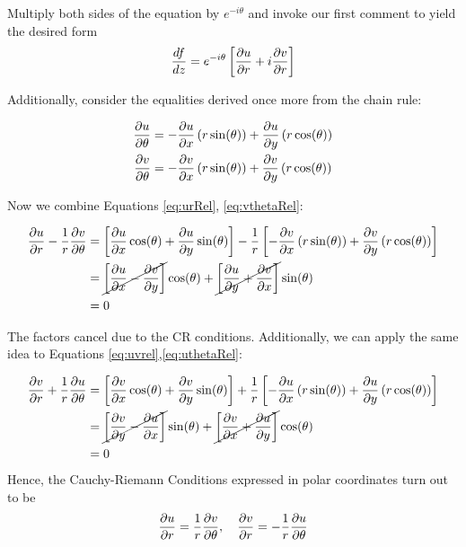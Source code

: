 \documentclass[12pt]{article}%
\begin{document}
Multiply both sides of the equation by $e^{-i\theta}$ and invoke our first comment to yield the desired form \[\frac{d{f}}{d{z}}= e^{-i\theta} \left[\frac{\partial{u}}{\partial{r}} + i\frac{\partial{v}}{\partial{r}} \right]\]

Additionally, consider the equalities derived once more from the chain rule:

\begin{align}
  \frac{\partial{u}}{\partial{\theta}} & = - \frac{\partial{u}}{\partial{x}}\left(r \sin(\theta)\right) + \frac{\partial{u}}{\partial{y}}\left(r\cos(\theta)\right) \label{eq:uthetaRel} \\
    \frac{\partial{v}}{\partial{\theta}} & = - \frac{\partial{v}}{\partial{x}}\left(r \sin(\theta)\right) + \frac{\partial{v}}{\partial{y}}\left(r\cos(\theta)\right) \label{eq:vthetaRel}
\end{align}

Now we combine Equations \ref{eq:urRel}, \ref{eq:vthetaRel}:

\begin{align*}
  \frac{\partial{u}}{\partial{r}} - \frac{1}{r}\frac{\partial{v}}{\partial{\theta}} & = \left[\frac{\partial{u}}{\partial{x}} \cos(\theta) + \frac{\partial{u}}{\partial{y}}\sin(\theta)\right] - \frac{1}{r}\left[- \frac{\partial{v}}{\partial{x}}\left(r \sin(\theta)\right) + \frac{\partial{v}}{\partial{y}}\left(r\cos(\theta)\right) \right] \\
  & = \cancel{\left[\frac{\partial{u}}{\partial{x}} - \frac{\partial{v}}{\partial{y}}\right]} \cos(\theta) + \cancel{\left[\frac{\partial{u}}{\partial{y}} +  \frac{\partial{v}}{\partial{x}}\right]} \sin(\theta) \\
  & = 0
\end{align*}

The factors cancel due to the CR conditions. Additionally, we can apply the same idea to Equations \ref{eq:uvrel},\ref{eq:uthetaRel}:

\begin{align*}
  \frac{\partial{v}}{\partial{r}} + \frac{1}{r}\frac{\partial{u}}{\partial{\theta}} & = \left[\frac{\partial{v}}{\partial{x}} \cos(\theta) + \frac{\partial{v}}{\partial{y}}\sin(\theta)\right] + \frac{1}{r}\left[- \frac{\partial{u}}{\partial{x}}\left(r \sin(\theta)\right) + \frac{\partial{u}}{\partial{y}}\left(r\cos(\theta)\right) \right] \\
  & = \cancel{\left[\frac{\partial{v}}{\partial{y}} - \frac{\partial{u}}{\partial{x}}\right]}\sin(\theta) + \cancel{\left[\frac{\partial{v}}{\partial{x}} + \frac{\partial{u}}{\partial{y}}\right]}\cos(\theta) \\
  & = 0
\end{align*}
Hence, the Cauchy-Riemann Conditions expressed in polar coordinates turn out to be \[\frac{\partial{u}}{\partial{r}} =  \frac{1}{r}\frac{\partial{v}}{\partial{\theta}}, \quad \frac{\partial{v}}{\partial{r}} = - \frac{1}{r}\frac{\partial{u}}{\partial{\theta}}\]
\end{document}
